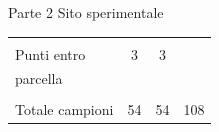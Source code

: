 \documentclass[10pt]{beamer}
\begin{document}
\begin{frame}{Parte 2 \small{Sito sperimentale}}
{\begin{table}[ht]
\begin{tabular}{|l|c|c|c|}
                     &                &                      &        \\
        \hline
                     &                &                      &        \\
        Punti entro  &          3     &    3                 &\\ 
        parcella     &                &                      &
        \\
        \hline
                     &                &                      &        \\
        Totale campioni& 54           &     54               &108   \\
        \hline
      \end{tabular}
    \end{table}
  }
\end{frame}
\end{document}
